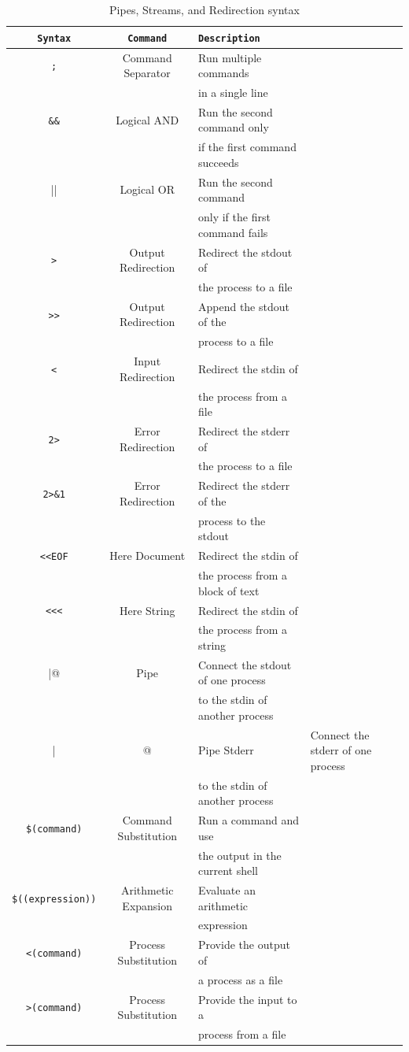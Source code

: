 \begin{table}[h!]
  \caption{Pipes, Streams, and Redirection syntax}
  \begin{tabular}{c c l}
    \toprule
    \lstinline|Syntax| & \lstinline|Command| & \lstinline|Description| \\
    \midrule
    \lstinline|;| & Command Separator & Run multiple commands\\ & & in a single line\\
    \lstinline|&&| & Logical AND & Run the second command only \\ & & if the first command succeeds\\
    \lstinline|||| & Logical OR & Run the second command \\ & & only if the first command fails\\
    \lstinline|>| & Output Redirection & Redirect the stdout of \\ & & the process to a file\\
    \lstinline|>>| & Output Redirection & Append the stdout of the \\ & & process to a file\\
    \lstinline|<| & Input Redirection & Redirect the stdin of \\ & & the process from a file\\
    \lstinline|2>| & Error Redirection & Redirect the stderr of \\ & & the process to a file\\
    \lstinline|2>&1| & Error Redirection & Redirect the stderr of the \\ & & process to the stdout\\
    \lstinline|<<EOF| & Here Document & Redirect the stdin of \\ & & the process from a block of text\\
    \lstinline|<<<| & Here String & Redirect the stdin of \\ & & the process from a string\\
    \lstinline@|@ & Pipe & Connect the stdout of one process \\ & & to the stdin of another process\\
    \lstinline@|&@ & Pipe Stderr & Connect the stderr of one process \\ & & to the stdin of another process\\
    \lstinline|$(command)| & Command Substitution & Run a command and use \\ & & the output in the current shell\\
    \lstinline|$((expression))| & Arithmetic Expansion & Evaluate an arithmetic \\ & & expression\\
    \lstinline|<(command)| & Process Substitution & Provide the output of \\ & & a process as a file\\
    \lstinline|>(command)| & Process Substitution & Provide the input to a \\ & & process from a file\\
    \bottomrule
  \end{tabular}
\end{table}
